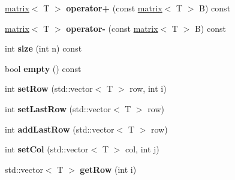 \begin{DoxyCompactItemize}
\item 
\hypertarget{classkeycpp_1_1matrix_a30e23cbddecec8be4dd89d7c3d36e611}{\hyperlink{classkeycpp_1_1matrix}{matrix}$<$ T $>$ {\bfseries operator+} (const \hyperlink{classkeycpp_1_1matrix}{matrix}$<$ T $>$ B) const }\label{classkeycpp_1_1matrix_a30e23cbddecec8be4dd89d7c3d36e611}

\item 
\hypertarget{classkeycpp_1_1matrix_abb5d07fed06a0d51ea0203c91e1c52bf}{\hyperlink{classkeycpp_1_1matrix}{matrix}$<$ T $>$ {\bfseries operator-\/} (const \hyperlink{classkeycpp_1_1matrix}{matrix}$<$ T $>$ B) const }\label{classkeycpp_1_1matrix_abb5d07fed06a0d51ea0203c91e1c52bf}

\item 
\hypertarget{classkeycpp_1_1matrix_a380afb3099fc7955b143602ddc17a28f}{int {\bfseries size} (int n) const }\label{classkeycpp_1_1matrix_a380afb3099fc7955b143602ddc17a28f}

\item 
\hypertarget{classkeycpp_1_1matrix_ad522f701e86eafc344d8904d4f0a8f19}{bool {\bfseries empty} () const }\label{classkeycpp_1_1matrix_ad522f701e86eafc344d8904d4f0a8f19}

\item 
\hypertarget{classkeycpp_1_1matrix_a133bb88c69cddc6c1e2dcdbdbbe3ce4f}{int {\bfseries set\-Row} (std\-::vector$<$ T $>$ row, int i)}\label{classkeycpp_1_1matrix_a133bb88c69cddc6c1e2dcdbdbbe3ce4f}

\item 
\hypertarget{classkeycpp_1_1matrix_ac1d7804d1af7f4376572a51fcdf112e4}{int {\bfseries set\-Last\-Row} (std\-::vector$<$ T $>$ row)}\label{classkeycpp_1_1matrix_ac1d7804d1af7f4376572a51fcdf112e4}

\item 
\hypertarget{classkeycpp_1_1matrix_a00cf9c7b83e6b4e1e156b339b98297a5}{int {\bfseries add\-Last\-Row} (std\-::vector$<$ T $>$ row)}\label{classkeycpp_1_1matrix_a00cf9c7b83e6b4e1e156b339b98297a5}

\item 
\hypertarget{classkeycpp_1_1matrix_a8a88af29e0e193d495b7c0146397aeda}{int {\bfseries set\-Col} (std\-::vector$<$ T $>$ col, int j)}\label{classkeycpp_1_1matrix_a8a88af29e0e193d495b7c0146397aeda}

\item 
\hypertarget{classkeycpp_1_1matrix_a0946b26c2ba7fb7d427f2f8b766f74d5}{std\-::vector$<$ T $>$ {\bfseries get\-Row} (int i)}\label{classkeycpp_1_1matrix_a0946b26c2ba7fb7d427f2f8b766f74d5}


\end{DoxyCompactItemize}
